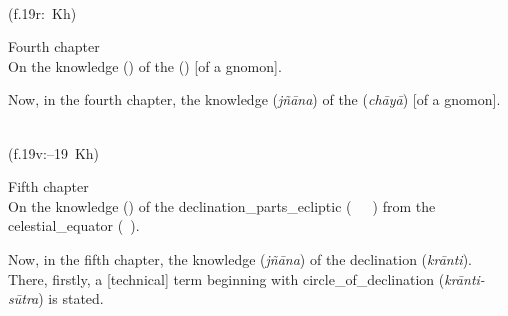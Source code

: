 
\begin{multicols}{2}
\noindent\reversemarginpar{}%
\columnbreak

\noindent\normalmarginpar{}%
\\ 
(f.\thinspace 19r:~Kh)
\end{multicols}%
%
\begin{multicols}{2}
Fourth chapter\\
On the \gls{knowledge} (\marifat) of the  (\zill) [of a gnomon].
\columnbreak

Now, in the fourth chapter, the \gls{knowledge} (\textit{jñāna}) of the  (\textit{chāyā}) [of a gnomon].
\end{multicols}

\newpage %


\begin{multicols}{2}
\noindent\reversemarginpar{}%
\columnbreak

\noindent\normalmarginpar{}%
\\
(f.\thinspace 19v:--19~Kh)
\end{multicols}%
%
\begin{multicols}{2}
Fifth chapter\\
On the \gls{knowledge} (\marifat) of the \gls{declination_parts_ecliptic} (\mayl\idafaconsonant\ \ajza\idafaconsonant\ \falak\ \alburuj) from the \gls{celestial_equator} (\muaddil\ \alnahar).
\columnbreak

Now, in the fifth chapter, the \gls{knowledge} (\textit{jñāna}) of the \gls{declination} (\textit{krānti}). There, firstly, a [technical] term beginning with \gls{circle_of_declination} (\textit{krānti-sūtra}) is stated.
\end{multicols}
\medskip

